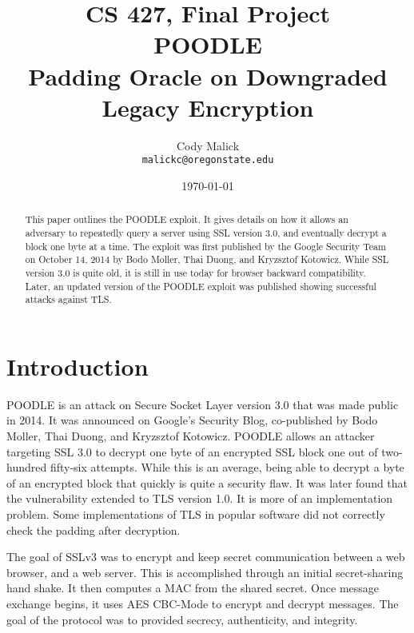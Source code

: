 \documentclass[10pt]{article}
\begin{document}
\title{CS 427, Final Project\\ POODLE\\ Padding Oracle on Downgraded Legacy
Encryption}
\author{Cody Malick\\
\texttt{malickc@oregonstate.edu}}
\date{\today}
\maketitle
\vspace{4cm}

\begin{abstract}
	This paper outlines the POODLE exploit. It gives details on how it
	allows an adversary to repeatedly query a server using SSL version 3.0,
	and eventually decrypt a block one byte at a time. The exploit was
	first published by the
	Google Security Team on October 14, 2014 by Bodo Moller, Thai Duong,
	and Kryzsztof Kotowicz. While SSL version 3.0 is quite old, it is still
	in use today for browser backward compatibility. Later, an updated
	version of the POODLE exploit was published showing successful attacks
	against TLS.

\end{abstract}

\clearpage

\section*{Introduction}
POODLE is an attack on Secure Socket Layer version 3.0 that was made public
in 2014. It was announced on Google's Security Blog, co-published by Bodo Moller,
Thai Duong, and Kryzsztof Kotowicz. POODLE allows an attacker targeting SSL 3.0
to decrypt one byte of an encrypted SSL block one out of two-hundred fifty-six 
attempts. While this is an average, being able to decrypt a byte of an encrypted
block that quickly is quite a security flaw.\cite{POODLE} It was later found
that the vulnerability extended to TLS version 1.0. It is
more of an implementation problem. Some implementations of TLS in popular software
did not correctly check the padding after decryption. \cite{POODLEBites}

The goal of SSLv3 was to encrypt and keep secret communication between a web
browser, and a web server. This is accomplished through an initial secret-sharing
hand shake. It then computes a MAC from the shared secret. Once message exchange
begins, it uses AES CBC-Mode to encrypt and decrypt messages.\cite{SSLv3} The
goal of the protocol was to provided secrecy, authenticity, and integrity. 
\end{document}
